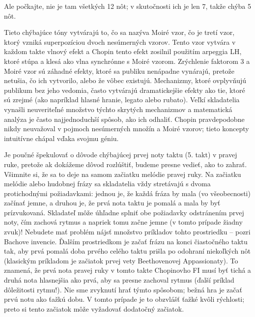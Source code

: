\documentclass[11pt,a4paper%
]{book}
\begin{document}
Ale počkajte, nie je tam všetkých 12 nôt; v skutočnosti ich je len 7, takže chýba 5 nôt.

Tieto chýbajúce tóny vytvárajú to, čo sa nazýva Moiré vzor, čo je tretí vzor, ktorý vzniká superpozíciou dvoch nesúmerných vzorov. Tento vzor vytvára v každom takte vlnový efekt a Chopin tento efekt zosilnil použitím arpeggia LH, ktoré stúpa a klesá ako vlna synchrónne s Moiré vzorom. Zrýchlenie faktorom 3 a Moiré vzor sú záhadné efekty, ktoré sa publiku nenápadne vynárajú, pretože netušia, čo ich vytvorilo, alebo že vôbec existujú. Mechanizmy, ktoré ovplyvňujú publikum bez jeho vedomia, často vytvárajú dramatickejšie efekty ako tie, ktoré sú zrejmé (ako napríklad hlasné hranie, legato alebo rubato). Veľkí skladatelia vynašli neuveriteľné množstvo týchto skrytých mechanizmov a matematická analýza je často najjednoduchší spôsob, ako ich odhaliť. Chopin pravdepodobne nikdy neuvažoval v pojmoch nesúmerných množín a Moiré vzorov; tieto koncepty intuitívne chápal vďaka svojmu géniu.

Je poučné špekulovať o dôvode chýbajúcej prvej noty taktu (5. takt) v pravej ruke, pretože ak dokážeme dôvod rozlúštiť, budeme presne vedieť, ako to zahrať. Všimnite si, že sa to deje na samom začiatku melódie pravej ruky. Na začiatku melódie alebo hudobnej frázy sa skladatelia vždy stretávajú s dvoma protichodnými požiadavkami: jednou je, že každá fráza by mala (vo všeobecnosti) začínať jemne, a druhou je, že prvá nota taktu je pomalá a mala by byť prízvukovaná. Skladateľ môže úhľadne splniť obe požiadavky odstránením prvej noty, čím zachová rytmus a napriek tomu začne jemne (v tomto prípade žiadny zvuk)! Nebudete mať problém nájsť množstvo príkladov tohto prostriedku -- pozri Bachove invencie. Ďalším prostriedkom je začať frázu na konci čiastočného taktu tak, aby prvá pomalá doba prvého celého taktu prišla po odohraní niekoľkých nôt (klasickým príkladom je začiatok prvej vety Beethovenovej Appassionaty). To znamená, že prvá nota pravej ruky v tomto takte Chopinovho FI musí byť tichá a druhá nota hlasnejšia ako prvá, aby sa presne zachoval rytmus (ďalší príklad dôležitosti rytmu!). Nie sme zvyknutí hrať týmto spôsobom; bežná hra je začať prvú notu ako ťažkú dobu. V tomto prípade je to obzvlášť ťažké kvôli rýchlosti; preto si tento začiatok môže vyžadovať dodatočný začiatok.
\end{document}
